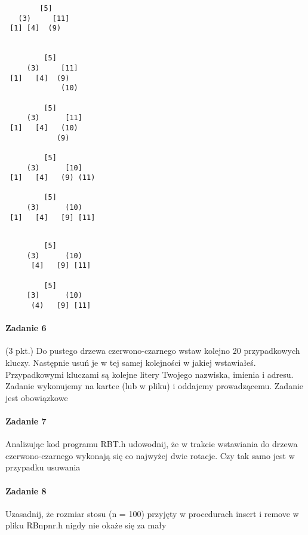 \documentclass[18pt]{extarticle}
\begin{document}
\begin{multicols}{2}
\begin{lstlisting}
        [5] 
   (3)     [11] 
 [1] [4]  (9) 


         [5] 
     (3)     [11] 
 [1]   [4]  (9) 
             (10) 
 
         [5] 
     (3)      [11] 
 [1]   [4]   (10) 
            (9) 
 
         [5] 
     (3)      [10] 
 [1]   [4]   (9) (11)
 
         [5] 
     (3)      (10) 
 [1]   [4]   [9] [11]
             
\end{lstlisting}

\columnbreak
\begin{lstlisting}
         [5] 
     (3)      (10) 
      [4]   [9] [11]

         [5] 
     [3]      (10) 
      (4)   [9] [11]
\end{lstlisting}
\end{multicols}


\paragraph{Zadanie 6} (3 pkt.) Do pustego drzewa czerwono-czarnego wstaw kolejno 20 przypadkowych kluczy. Następnie usuń je w tej samej kolejności w jakiej wstawiałeś. Przypadkowymi kluczami są kolejne litery Twojego nazwiska, imienia i adresu. Zadanie wykonujemy na kartce (lub w pliku) i oddajemy prowadzącemu. Zadanie jest obowiązkowe

\paragraph{Zadanie 7} Analizując kod programu RBT.h udowodnij, że w trakcie wstawiania do drzewa czerwono-czarnego wykonają się co najwyżej dwie rotacje. Czy tak samo jest w przypadku usuwania


\paragraph{Zadanie 8} Uzasadnij, że rozmiar stosu (n = 100) przyjęty w procedurach insert i remove w pliku RBnpnr.h nigdy nie okaże się za mały
\end{document}
